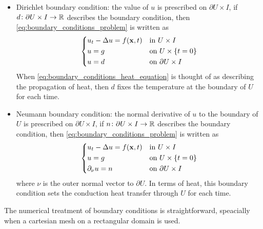 \begin{itemize}
	\item Dirichlet boundary condition: the value of $u$ is prescribed on $\partial U \times I$, \ie if $d \colon \partial U \times I \rightarrow \mathbb{R}$ describes the boundary condition, then \eqref{eq:boundary_conditions_problem} is written as
	\begin{equation}
		\left\{
		\begin{aligned}
			&u_t - \Delta u = f(\vb{x}, t) & &\text{in } U \times I \\
			&u = g & &\text{on } U \times \{ t = 0 \} \\
			&u = d & &\text{on } \partial U \times I
		\end{aligned}
		\right.
	\end{equation}
	When \eqref{eq:boundary_conditions_heat_equation} is thought of as describing the propagation of heat, then $d$ fixes the temperature at the boundary of $U$ for each time.
	\item Neumann boundary condition: the normal derivative of $u$ to the boundary of $U$ is prescribed on $\partial U \times I$, \ie if $n \colon \partial U \times I \rightarrow \mathbb{R}$ describes the boundary condition, then \eqref{eq:boundary_conditions_problem} is written as
	\begin{equation}
		\left\{
		\begin{aligned}
			&u_t - \Delta u = f(\vb{x}, t) 	& &\text{in } U \times I \\
			&u = g 							& &\text{on } U \times \{ t = 0 \} \\
			&\partial_{\nu} u = n 			& &\text{on } \partial U \times I
		\end{aligned}
		\right.
	\end{equation}
	where $\nu$ is the outer normal vector to $\partial U$. In terms of heat, this boundary condition sets the conduction heat transfer through $U$ for each time.
\end{itemize}

The numerical treatment of boundary conditions is straightforward, speacially when a cartesian mesh on a rectangular domain is used.

